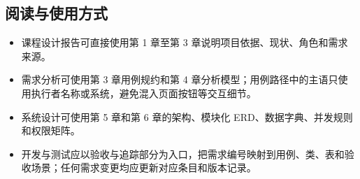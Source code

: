 \subsection*{阅读与使用方式}

\begin{itemize}
\item
  课程设计报告可直接使用第 1 章至第 3 章说明项目依据、现状、角色和需求来源。
\item
  需求分析可使用第 3 章用例规约和第 4 章分析模型；用例路径中的主语只使用执行者名称或系统，避免混入页面按钮等交互细节。
\item
  系统设计可使用第 5 章和第 6 章的架构、模块化 ERD、数据字典、并发规则和权限矩阵。
\item
  开发与测试应以验收与追踪部分为入口，把需求编号映射到用例、类、表和验收场景；任何需求变更均应更新对应条目和版本记录。
\end{itemize}
